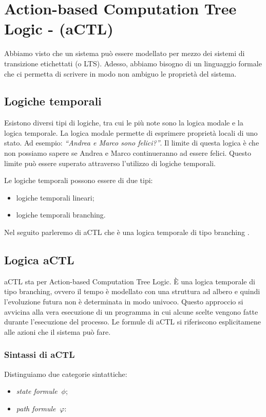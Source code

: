 \section{Action-based Computation Tree Logic - (aCTL)}
Abbiamo visto che un sistema può essere modellato per mezzo dei sistemi di transizione etichettati (o LTS). Adesso, abbiamo bisogno di un linguaggio formale che ci permetta di scrivere in modo non ambiguo le proprietà del sistema.

\subsection{Logiche temporali}
Esistono diversi tipi di logiche, tra cui le più note sono la logica modale e la logica temporale. La logica modale permette di esprimere proprietà locali di uno stato. Ad esempio: \emph{``Andrea e Marco sono felici?''}. Il limite di questa logica è che non possiamo sapere se Andrea e Marco continueranno ad essere felici. Questo limite può essere superato attraverso l'utilizzo di logiche temporali.

Le logiche temporali possono essere di due tipi:

\begin{itemize}
 \item logiche temporali lineari;
 \item logiche temporali branching.
\end{itemize}

\noindent Nel seguito parleremo di aCTL che è una logica temporale di tipo branching \cite{NoteProf}.

\subsection{Logica aCTL}
aCTL sta per Action-based Computation Tree Logic. È una logica temporale di tipo branching, ovvero il tempo è modellato con una struttura ad albero e quindi l'evoluzione futura non è determinata in modo univoco. Questo approccio si avvicina alla vera esecuzione di un programma in cui alcune scelte vengono fatte durante l'esecuzione del processo.
Le formule di aCTL si riferiscono esplicitamene alle azioni che il sistema può fare.

\clearpage
\subsubsection{Sintassi di aCTL}
Distinguiamo due categorie sintattiche:

\begin{itemize}
 \item \emph{state formule} $\ \phi$;
 \item \emph{path formule} $\ \varphi$:
\end{itemize}

